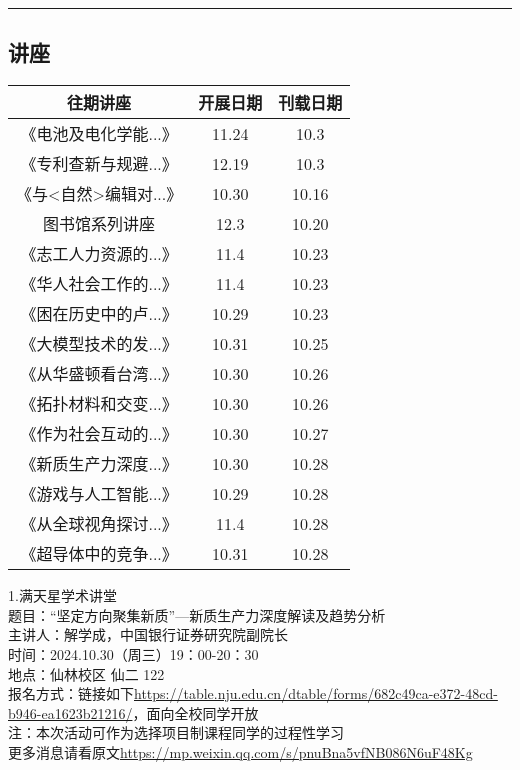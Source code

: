 \documentclass[letterpaper, 12pt]{article}
\begin{document}
\hrule
\pagebreak
\begin{multicols}{2}

\section{讲座}
\begin{tabular}{|c|c|c|}
    \hline
    往期讲座 & 开展日期 & 刊载日期\\
    \hline\hline
    《电池及电化学能...》 & 11.24 & 10.3\\
    《专利查新与规避...》 & 12.19 & 10.3\\
    《与<自然>编辑对...》 & 10.30 & 10.16\\
    图书馆系列讲座 & 12.3 & 10.20\\
    《志工人力资源的...》 & 11.4 & 10.23\\
    《华人社会工作的...》 & 11.4 & 10.23\\
    《困在历史中的卢...》 & 10.29 & 10.23\\
    《大模型技术的发...》 & 10.31 & 10.25\\
    《从华盛顿看台湾...》 & 10.30 & 10.26\\
    《拓扑材料和交变...》 & 10.30 & 10.26\\
    《作为社会互动的...》 & 10.30 & 10.27\\
    《新质生产力深度...》 & 10.30 & 10.28\\
    《游戏与人工智能...》 & 10.29 & 10.28\\
    《从全球视角探讨...》 & 11.4 & 10.28\\
    《超导体中的竞争...》 & 10.31 & 10.28\\
    \hline
\end{tabular}

1.满天星学术讲堂\\
题目：“坚定方向聚集新质”—新质生产力深度解读及趋势分析\\
主讲人：解学成，中国银行证券研究院副院长\\
时间：2024.10.30（周三）19：00-20：30\\
地点：仙林校区 仙二 122\\
报名方式：链接如下\url{https://table.nju.edu.cn/dtable/forms/682c49ca-e372-48cd-b946-ea1623b21216/}，面向全校同学开放\\
注：本次活动可作为选择项目制课程同学的过程性学习\\
更多消息请看原文\url{https://mp.weixin.qq.com/s/pnuBna5vfNB086N6uF48Kg}\\


\end{multicols}
\end{document}
